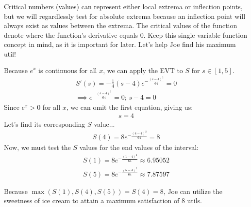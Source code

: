 Critical numbers (values) can represent either local extrema or inflection points, but we will regardlessly test for absolute extrema because an inflection point will always exist as values between the extrema.
The critical values of the function denote where the function's derivative equals $0$.
Keep this single variable function concept in mind, as it is important for later.
Let's help Joe find his maximum util!

Because $e^x$ is continuous for all $x$, we can apply the EVT to $S$ for $s\in[1, 5]$.
\begin{align*}
	S'(s)=-\frac{1}{4}(s-4)e^{-\frac{(s-4)^2}{64}}=0\\
	\implies e^{-\frac{(s-4)^2}{64}}=0\text{; }s-4=0
\end{align*}
Since $e^x > 0$ for all $x$, we can omit the first equation, giving us:
\begin{align*}
	s = 4
\end{align*}
Let's find its corresponding $S$ value...
\begin{align*}
	S(4) = 8e^{-\frac{(4-4)^2}{64}} = 8
\end{align*}
Now, we must test the $S$ values for the end values of the interval:
\begin{align*}
	S(1) = 8e^{-\frac{(1-4)^2}{64}} \approx 6.95052\\
	S(5) = 8e^{-\frac{(5-4)^2}{64}} \approx 7.87597
\end{align*}

Because $\max(S(1), S(4), S(5)) = S(4) = 8$, Joe can utilize the sweetness of ice cream to attain a maximum satisfaction of $8$ utils.